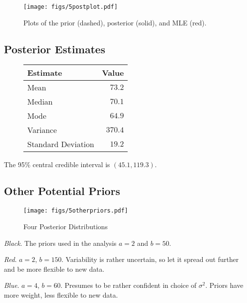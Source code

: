 \documentclass[12pt]{article}
\begin{document}
\begin{figure}[H]
\begin{center}
\texttt{[image: figs/5postplot.pdf]}
\caption{Plots of the prior (dashed), posterior (solid), and MLE (red).}
\end{center}
\end{figure}

\subsection{Posterior Estimates}

\begin{figure}[H]
\begin{center}
\begin{tabular}{l|r}
Estimate & \multicolumn{1}{l}{Value} \\ \hline \hline
Mean               & $73.2$ \\
Median             & $70.1$ \\
Mode               & $64.9$ \\
Variance           & $370.4$ \\
Standard Deviation & $19.2$ \\
\end{tabular}
\end{center}
\end{figure}

The 95\% central credible interval is $(45.1, 119.3)$.

\subsection{Other Potential Priors}

\begin{figure}[H]
\begin{center}
\texttt{[image: figs/5otherpriors.pdf]}
\caption{Four Posterior Distributions}
\end{center}
\end{figure}

\noindent \emph{Black}.  The priors used in the analysis $a=2$ and $b=50$.

\noindent \emph{Red}. $a=2$, $b=150$.  Variability is rather uncertain, so let it spread out further and be more flexible to new data.

\noindent \emph{Blue}. $a=4$, $b=60$.  Presumes to be rather confident in choice of $\sigma^2$.  Priors have more weight, less flexible to new data.
\end{document}
